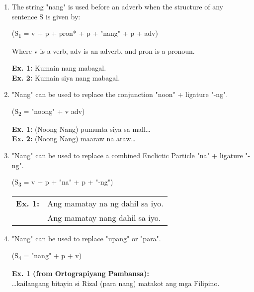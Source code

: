 \begin{enumerate}
      \item The string "nang" is used before an adverb when the structure of any sentence S is given by:

            \begin{center}
                  (S\textsubscript{1} = v + p + pron* + p + "nang" + p + adv)
            \end{center}

            Where v is a verb, adv is an adverb, and pron is a pronoun.

            \textbf{Ex. 1:} Kumain nang mabagal. \\
            \textbf{Ex. 2:} Kumain siya nang mabagal.
      
      \item "Nang" can be used to replace the conjunction "noon" + ligature "-ng".

            \begin{center}
                  (S\textsubscript{2} = "noong" + v {\textpipe} adv)
            \end{center}

            \textbf{Ex. 1:} (Noong {\textpipe} Nang) pumunta siya sa mall… \\
            \textbf{Ex. 2:} (Noong {\textpipe} Nang) maaraw na araw…

      \item "Nang" can be used to replace a combined Enclictic Particle "na" + ligature "-ng".

            \begin{center}
                  (S\textsubscript{3} = v + p + "na" + p + "-ng")
            \end{center}

            \begin{tabular}{@{}l@{\ }l}
                  \textbf{Ex. 1:} & Ang mamatay na ng dahil sa iyo. \\
                                  & Ang mamatay nang dahil sa iyo.
            \end{tabular}
      
      \item "Nang" can be used to replace "upang" or "para".

            \begin{center}
                  (S\textsubscript{4} = "nang" + p + v)
            \end{center}

            \textbf{Ex. 1 (from Ortograpiyang Pambansa):} \\
            …kailangang bitayin si Rizal (para {\textpipe} nang) matakot ang mga Filipino.


\end{enumerate}
